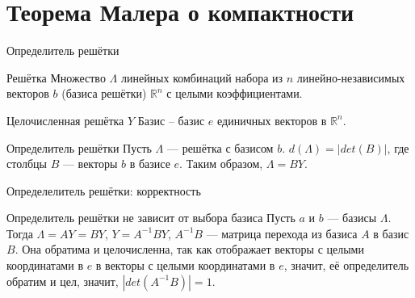 \documentclass[10pt]{beamer}
\begin{document}
\section{Теорема Малера о компактности}

\begin{frame}{Определитель решётки}

\begin{block}{Решётка}
  Множество $\Lambda$ линейных комбинаций набора из $n$ линейно-независимых векторов $b$ (базиса решётки) $\mathbb{R}^n$ с целыми коэффициентами.
\end{block}

\begin{exampleblock}{Целочисленная решётка $Y$}
  Базис -- базис $e$ единичных векторов в $\mathbb{R}^n$.
\end{exampleblock}

\begin{alertblock}{Определитель решётки}
  Пусть $\Lambda$ --- решётка с базисом $b$. $d(\Lambda) = \left|det(B)\right|$, где столбцы $B$ --- векторы $b$ в базисе $e$. Таким образом, $\Lambda = BY$.
\end{alertblock}

\end{frame}

\begin{frame}{Определелитель решётки: корректность}

\begin{block}{Определитель решётки не зависит от выбора базиса}
  Пусть $a$ и $b$ --- базисы $\Lambda$. Тогда $\Lambda = AY = BY$, $Y = A^{-1}BY$, $A^{-1}B$ --- матрица перехода из базиса $A$ в базис $B$. Она обратима и целочисленна, так как отображает векторы с целыми координатами в $e$ в векторы с целыми координатами в $e$, значит, её определитель обратим и цел, значит, $\left|det(A^{-1}B)\right| = 1$.
\end{block}

\end{frame}
\end{document}
